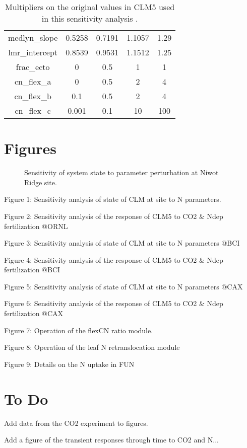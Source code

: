 \documentclass[draft,linenumbers]{agujournal}
\begin{document}
{\begin{table}
\begin{center}
\begin{tabular}{ |c|c|c|c|c| }
     medlyn\_slope  &0.5258 & 0.7191 & 1.1057  &1.29\\
      lmr\_intercept & 0.8539 & 0.9531 & 1.1512& 1.25\\
      frac\_ecto & 0 &0.5& 1 & 1 \\
      cn\_flex\_a &0 &0.5 & 2  &4\\
      cn\_flex\_b & 0.1 & 0.5 & 2  & 4\\
      cn\_flex\_c &0.001 & 0.1 & 10 & 100\\
\hline
\end{tabular}
\end{center}
\caption{Multipliers on the original values in CLM5 used in this sensitivity analysis .}
\label{table_ranges}
\end{table}



\section{Figures}

\begin{figure}[h]
     \caption{Sensitivity of system state to parameter perturbation at Niwot Ridge site.}
     \label{NWRstate}
  \end{figure}
Figure 1: Sensitivity analysis of state of CLM at site to N parameters.

Figure 2: Sensitivity analysis of the response of CLM5 to CO2 \& Ndep fertilization @ORNL

Figure 3: Sensitivity analysis of state of CLM at site to N parameters @BCI

Figure 4: Sensitivity analysis of the response of CLM5 to CO2 \& Ndep fertilization @BCI

Figure 5: Sensitivity analysis of state of CLM at site to N parameters @CAX

Figure 6: Sensitivity analysis of the response of CLM5 to CO2 \& Ndep fertilization @CAX

Figure 7: Operation of the flexCN ratio module.

Figure 8: Operation of the leaf N retranslocation module

Figure 9: Details on the N uptake in FUN


\section{To Do}
Add data from the CO2 experiment to figures.

Add a figure of the transient responses through time to CO2 and N... 

}
\end{document}
